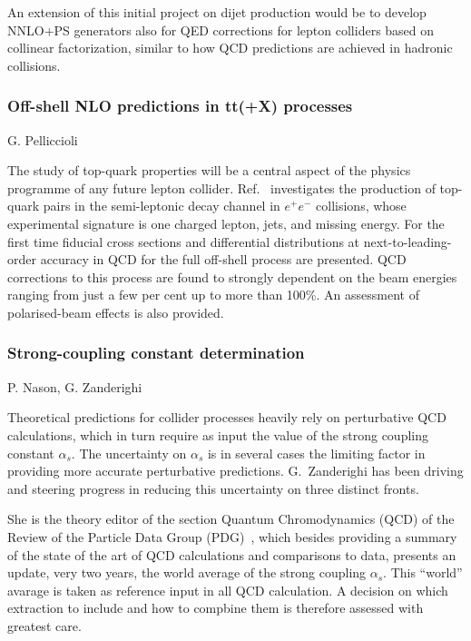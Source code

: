 \documentclass{FBR_Bericht_2025}
\begin{document}
\begin{refsection}
An extension of this initial project on dijet production would be to develop NNLO+PS generators
also for QED corrections for lepton colliders based on collinear factorization, similar to how 
QCD predictions are achieved in hadronic collisions.


\subsubsection{Off-shell NLO predictions in tt(+X) processes}
\begin{Namen}
G. Pelliccioli
\end{Namen}

The study of top-quark properties will be a central aspect of the physics programme of any future lepton collider. Ref.~\cite{Denner:2023grl} investigates the production of top-quark pairs in the semi-leptonic decay channel in $e^+e^-$ collisions, whose experimental signature is one charged lepton, jets, and missing energy. For the first time fiducial cross sections and differential distributions at next-to-leading-order accuracy in QCD for the full off-shell process are presented. QCD corrections to this process are found to strongly dependent on the beam energies ranging from just a few per cent up to more than 100\%. An assessment of polarised-beam effects is also provided.


\subsubsection{Strong-coupling constant determination}
\begin{Namen}
P. Nason, G. Zanderighi
\end{Namen}
%
Theoretical predictions for collider processes heavily rely on
perturbative QCD calculations, which in turn require as input the
value of the strong coupling constant $\alpha_s$. The uncertainty on
$\alpha_s$ is in several cases the limiting factor in providing more
accurate perturbative predictions.
%
G.~Zanderighi has been driving and steering progress in reducing this
uncertainty on three distinct fronts.

She is the theory editor of the section Quantum Chromodynamics
(QCD) of the Review of the Particle Data Group
(PDG)~\cite{ParticleDataGroup:2022pth,ParticleDataGroup:2024cfk},
which besides providing a summary of the state of the art of QCD
calculations and comparisons to data, presents an update, very two
years, the world average of the strong coupling $\alpha_s$. This
``world'' avarage is taken as reference input in all QCD
calculation. A decision on which extraction to include and how to
compbine them is therefore assessed with greatest care.


\end{refsection}
\end{document}
